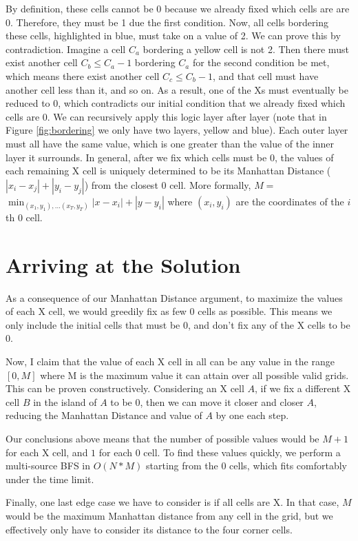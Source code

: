 \documentclass[15pt]{article}
\begin{document}
By definition, these cells cannot be 0 because we already fixed which cells are are 0. Therefore, they must be 1 due the first condition. Now, all cells bordering these cells, highlighted in blue, must take on a value of 2. We can prove this by contradiction. Imagine a cell $C_a$ bordering a yellow cell is not 2. Then there must exist another cell $C_b \le C_a-1$ bordering $C_a$ for the second condition be met, which means there exist another cell $C_c \leq C_b-1$, and that cell must have another cell less than it, and so on. As a result, one of the Xs must eventually be reduced to 0, which contradicts our initial condition that we already fixed which cells are 0. We can recursively apply this logic layer after layer (note that in Figure \ref{fig:bordering} we only have two layers, yellow and blue). Each outer layer must all have the same value, which is one greater than the value of the inner layer it surrounds. In general, after we fix which cells must be 0, the values of each remaining X cell is uniquely determined to be its Manhattan Distance ($|x_i - x_j| + |y_i - y_j|$) from the closest 0 cell. More formally, $M = $
$\displaystyle \min_{(x_1, y_1),\dots (x_T, y_T)} |x - x_i| + |y - y_i|$ where $(x_i, y_i)$ are the coordinates of the $i$th 0 cell.

\section{Arriving at the Solution}

As a consequence of our Manhattan Distance argument, to maximize the values of each X cell, we would greedily fix as few 0 cells as possible. This means we only include the initial cells that must be 0, and don't fix any of the X cells to be 0. 

Now, I claim that the value of each X cell in all can be any value in the range $[0, M]$ where M is the maximum value it can attain over all possible valid grids. This can be proven constructively. Considering an X cell $A$, if we fix a different X cell $B$ in the island of $A$ to be 0, then we can move it closer and closer $A$, reducing the Manhattan Distance and value of $A$ by one each step.

Our conclusions above means that the number of possible values would be $M+1$ for each X cell, and $1$ for each 0 cell. To find these values quickly, we perform a multi-source BFS in $O(N*M)$ starting from the 0 cells, which fits comfortably under the time limit.

Finally, one last edge case we have to consider is if all cells are X. In that case, $M$ would be the maximum Manhattan distance from any cell in the grid, but we effectively only have to consider its distance to the four corner cells.
\end{document}
